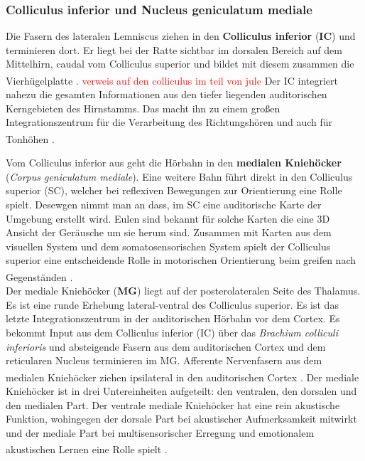 \documentclass[12pt,a4paper,pdftex]{article}
\begin{document}
\newpage
\subsubsection*{Colliculus inferior und Nucleus geniculatum mediale}

Die Fasern des lateralen Lemniscus ziehen in den \textbf{Colliculus inferior} (\textbf{IC}) und terminieren dort. Er liegt bei der Ratte sichtbar im dorsalen Bereich auf dem Mittelhirn, caudal vom Colliculus superior und bildet mit diesem zusammen die Vierhügelplatte \textsuperscript{\cite[29]{paxinos2014rat}}. \textcolor{red}{verweis auf den colliculus im teil von jule} 
Der IC integriert nahezu die gesamten Informationen aus den tiefer liegenden auditorischen Kerngebieten des Hirnstamms. Das macht ihn zu einem großen Integrationszentrum für die Verarbeitung des Richtungshören und auch für Tonhöhen \textsuperscript{\cite[29]{paxinos2014rat}}.

Vom Colliculus inferior aus geht die Hörbahn in den \textbf{medialen Kniehöcker} (\textit{Corpus geniculatum mediale}). Eine weitere Bahn führt direkt in den Colliculus superior (SC), welcher bei reflexiven Bewegungen zur Orientierung eine Rolle spielt. Desewgen nimmt man an dass, im SC eine auditorische Karte der Umgebung erstellt wird. Eulen sind bekannt für solche Karten die eine 3D Ansicht der Geräusche um sie herum sind. Zusammen mit Karten aus dem visuellen System und dem somatosensorischen System spielt der Colliculus superior eine entscheidende Rolle in motorischen Orientierung beim greifen nach Gegenständen \textsuperscript{\cite[31]{kandel2013principles}}.
\\
Der mediale Kniehöcker (\textbf{MG}) liegt auf der posterolateralen Seite des Thalamus. Es ist eine runde Erhebung lateral-ventral des Colliculus superior. Es ist das letzte Integrationszentrum in der auditorischen Hörbahn vor dem Cortex. Es bekommt Input aus dem Colliculus inferior (IC) über das \textit{Brachium colliculi inferioris} und absteigende Fasern aus dem auditorischen Cortex und dem reticularen Nucleus terminieren im MG. Afferente Nervenfasern aus dem medialen Kniehöcker ziehen ipsilateral in den auditorischen Cortex \textsuperscript{\cite[29]{paxinos2014rat}}. Der mediale Kniehöcker ist in drei Untereinheiten aufgeteilt: den ventralen, den dorsalen und den medialen Part. Der ventrale mediale Kniehöcker hat eine rein akustische Funktion, wohingegen der dorsale Part bei akustischer Aufmerksamkeit mitwirkt und der mediale Part bei multisensorischer Erregung und emotionalem akustischen Lernen eine Rolle spielt \textsuperscript{\cite[29]{paxinos2014rat}}.
\end{document}
